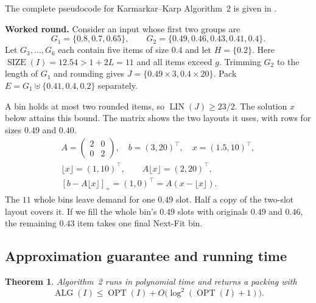 \documentclass[11pt,a4paper,onecolumn]{article}
\theoremstyle{plain}
\newtheorem{theorem}{Theorem}[section]
\theoremstyle{definition}
\theoremstyle{remark}
\newcommand{\pos}[1]{\left[#1\right]_+}
\DeclareMathOperator{\OPT}{OPT}
\DeclareMathOperator{\ALG}{ALG}
\DeclareMathOperator{\SIZE}{SIZE}
\DeclareMathOperator{\LIN}{LIN}
\begin{document}
The complete pseudocode for Karmarkar--Karp Algorithm~2 is given in
.


\noindent\begin{minipage}{\linewidth}
\textbf{Worked round.}
Consider an input whose first two groups are
\[
  G_1=\{0.8,0.7,0.65\},\qquad
  G_2=\{0.49,0.46,0.43,0.41,0.4\}.
\]
Let $G_3,\ldots,G_6$ each contain five items of size $0.4$ and let
$H=\{0.2\}$. Here $\SIZE(I)=12.54>1+2L=11$ and all items exceed $g$.
Trimming $G_2$ to the length of $G_1$ and rounding gives
$J=\{0.49\times3,0.4\times20\}$. Pack $E=G_1\uplus\{0.41,0.4,0.2\}$
separately.

\smallskip
A bin holds at most two rounded items, so $\LIN(J)\ge23/2$.
The solution $x$ below attains this bound. The matrix shows the
two layouts it uses, with rows for sizes $0.49$ and $0.40$.
\[
  \begin{gathered}
    A=\begin{pmatrix}2&0\\0&2\end{pmatrix},\quad
    b=(3,20)^\top,\quad x=(1.5,10)^\top,\\
    \lfloor x\rfloor=(1,10)^\top,\qquad
    A\lfloor x\rfloor=(2,20)^\top,\\
    \pos{b-A\lfloor x\rfloor}=(1,0)^\top=A(x-\lfloor x\rfloor).
  \end{gathered}
\]
The $11$ whole bins leave demand for one $0.49$ slot. Half a copy
of the two-slot layout covers it. If we fill the whole bin's
$0.49$ slots with originals $0.49$ and $0.46$, the remaining $0.43$
item takes one final Next-Fit bin.
\end{minipage}\par

\subsection{Approximation guarantee and running time}

\begin{theorem}\label{thm:kk-guarantee}
Algorithm~2 runs in polynomial time and returns a packing with
\[
  \ALG(I)\le\OPT(I)+O\bigl(\log^2(\OPT(I)+1)\bigr).
\]
\end{theorem}
\end{document}
